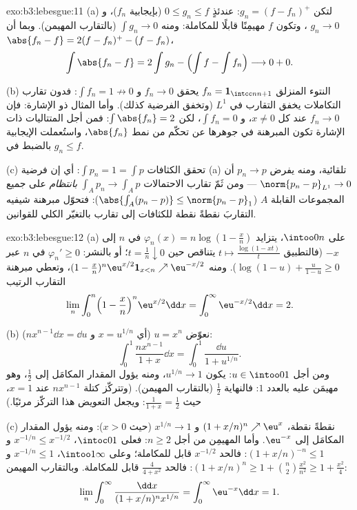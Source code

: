 \begin{solution}{exo:b3:lebesgue:11}
(a) لتكن $g_n = (f - f_n)^+$: عندئذٍ $0 \leq g_n \leq f$ (بإيجابية $f_n$)، و $g_n \to 0$
، وتكون $f$ مهيمِنًا قابلًا للمكاملة: ومنه
$\int g_n \to 0$ (بالتقارب المهيمن). وبما أن $\abs{f_n - f} = 2(f - f_n)^+ - (f - f_n)$،
\[
\int\abs{f_n - f} = 2\int g_n - \Bigl(\int f - \int
f_n\Bigr) \longrightarrow 0 + 0 .
\]

(b) النتوء المنزلق $f_n = \mathbf 1_{\intcc n{n+1}}$ يحقق $f_n \to 0$ 
و $\int f_n = 1 \not\to 0$: فدون تقارب التكاملات يخفق التقارب في $L^1$ (وتخفق
الفرضية كذلك). وأما المثال ذو الإشارة: فإن $f_n \to 0$ عند كل
$x \neq 0$، و $\int f_n = 0$، لكن $\int\abs{f_n} = 2$: فمن أجل المتتاليات
ذات الإشارة تكون المبرهنة في جوهرها عن تحكّم من نمط
$\abs{f_n}$، واستُعملت الإيجابية بالضبط في $g_n \leq f$.

(c) تحقق الكثافات $\int p_n = 1 = \int p$: أي إن فرضية (a) تلقائية، ومنه يفرض
$p_n \to p$  أن $\norm{p_n - p}_{L^1} \to 0$ --- ومن ثَمّ تقارب
الاحتمالات $\int_Ap_n \to \int_Ap$ \emph{بانتظام} على جميع المجموعات القابلة
 $A$ ($\abs{\int_A(p_n - p)} \leq
\norm{p_n - p}_1$): فتحوّل مبرهنة شيفيه التقاربَ نقطةً نقطة
للكثافات إلى تقارب بالتغيّر الكلي للقوانين.
\end{solution}

\begin{solution}{exo:b3:lebesgue:12}
(a) على $\intoo0n$، يتزايد $\varphi_n(x) = n\log(1 - \frac xn)$ في $n$ إلى $-x$ (فالتطبيق
$t \mapsto
\frac{\log(1 - xt)}{t}$ يتناقص حين $t = \frac1n
\downarrow 0$؛ أو بالنشر: $\varphi_{n}' \geq 0$ في $n$ عبر
$\log(1-u) + \frac{u}{1-u} \geq 0$). ومنه $(1 -
\frac xn)^n\eu^{x/2}\mathbf 1_{x<n} \nearrow
\eu^{-x/2}$، وتعطي مبرهنة التقارب الرتيب
\[
\lim_n\int_0^n\Bigl(1 - \frac xn\Bigr)^n\eu^{x/2}\dd x =
\int_0^\infty\eu^{-x/2}\dd x = 2 .
\]

(b) نعوّض $u = x^n$ (أي $x = u^{1/n}$ و $n x^{n-1}\dd x =
\dd u$):
\[
\int_0^1\frac{nx^{n-1}}{1 + x}\dd x =
\int_0^1\frac{\dd u}{1 + u^{1/n}} .
\]
ومن أجل $u \in \intoo01$: يكون $u^{1/n} \to 1$، ومنه يؤول
المقدار المكامَل إلى $\frac12$، وهو مهيمَن عليه بالعدد $1$:
فالنهاية $\frac12$ (بالتقارب المهيمن). (وتتركّز كتلة $nx^{n-1}$
عند $x
= 1$، حيث $\frac1{1+x} = \frac12$: ويجعل التعويض هذا التركّز مرئيًا.)

(c) نقطةً نقطة، $(1 + x/n)^n \nearrow \eu^x$ و $x^{1/n} \to
1$ (حيث $x > 0$): ومنه يؤول
المقدار المكامَل إلى $\eu^{-x}$. وأما المهيمِن من أجل
$n \geq 2$: فعلى $\intoc01$، $x^{-1/n} \leq x^{-1/2}$ و $(1 + x/n)^{-n} \leq 1$: فالحد
$x^{-1/2}$ قابل للمكاملة؛ وعلى $\intoo1\infty$، $x^{-1/n} \leq 1$
و $(1 + x/n)^n \geq 1 +
\binom n2\frac{x^2}{n^2} \geq 1 + \frac{x^2}4$: فالحد $\frac{4}{4 + x^2}$ قابل للمكاملة. وبالتقارب المهيمن:
\[
\lim_n\int_0^\infty\frac{\dd x}{(1 + x/n)^nx^{1/n}} =
\int_0^\infty\eu^{-x}\dd x = 1 .
\]
\end{solution}


